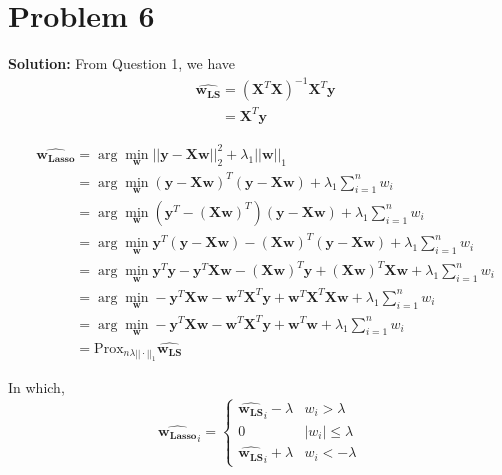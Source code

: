 \documentclass[11pt]{article}
\begin{document}
\section*{Problem 6}
\textbf{Solution:} From Question 1, we have
\begin{align}
	&\hat{\mathbf{w_{LS}}} = (\mathbf{X}^T\mathbf{X})^{-1}\mathbf{X}^T\mathbf{y}\nonumber\\
	&\phantom{\hat{\mathbf{w_{LS}}}} = \mathbf{X}^T\mathbf{y}\nonumber
\end{align}

\begin{align}
	&\hat{\mathbf{w_{\text{Lasso}}}} = \arg\min_{\mathbf{w}} ||\mathbf{y} - \mathbf{Xw}||^2_2 + \lambda_1||\mathbf{w}||_1\nonumber\\
	&\phantom{\hat{\mathbf{w_{\text{Lasso}}}}} = \arg\min_{\mathbf{w}} (\mathbf{y} - \mathbf{Xw})^T(\mathbf{y} - \mathbf{Xw}) + \lambda_1 \sum_{i = 1}^n w_i\nonumber\\
	&\phantom{\hat{\mathbf{w_{\text{Lasso}}}}} = \arg\min_{\mathbf{w}} (\mathbf{y}^T - (\mathbf{Xw})^T)(\mathbf{y} - \mathbf{Xw}) + \lambda_1 \sum_{i = 1}^n w_i\nonumber\\
	&\phantom{\hat{\mathbf{w_{\text{Lasso}}}}} = \arg\min_{\mathbf{w}} \mathbf{y}^T(\mathbf{y} - \mathbf{Xw}) - (\mathbf{Xw})^T(\mathbf{y} - \mathbf{Xw}) + \lambda_1 \sum_{i = 1}^n w_i\nonumber\\
	&\phantom{\hat{\mathbf{w_{\text{Lasso}}}}} = \arg\min_{\mathbf{w}} \mathbf{y}^T\mathbf{y} - \mathbf{y}^T\mathbf{Xw} - (\mathbf{Xw})^T\mathbf{y} + (\mathbf{Xw})^T\mathbf{Xw} + \lambda_1 \sum_{i = 1}^n w_i\nonumber\\
	&\phantom{\hat{\mathbf{w_{\text{Lasso}}}}} = \arg\min_{\mathbf{w}} - \mathbf{y}^T\mathbf{Xw} - \mathbf{w}^T\mathbf{X}^T\mathbf{y} + \mathbf{w}^T\mathbf{X}^T\mathbf{Xw} + \lambda_1 \sum_{i = 1}^n w_i\nonumber\\
	&\phantom{\hat{\mathbf{w_{\text{Lasso}}}}} = \arg\min_{\mathbf{w}} - \mathbf{y}^T\mathbf{Xw} - \mathbf{w}^T\mathbf{X}^T\mathbf{y} + \mathbf{w}^T\mathbf{w} + \lambda_1 \sum_{i = 1}^n w_i\nonumber\\
	&\phantom{\hat{\mathbf{w_{\text{Lasso}}}}} = \text{Prox}_{n\lambda||\cdot||_1} \hat{\mathbf{w_{LS}}}\nonumber
\end{align}

In which,
\[
	\hat{\mathbf{w_{\text{Lasso}}}}_i = 
		\begin{cases}
			\hat{\mathbf{w_{LS}}}_i - \lambda & w_i > \lambda \\
			0 & |w_i| \leq \lambda \\
			\hat{\mathbf{w_{LS}}}_i + \lambda & w_i < -\lambda
		\end{cases}
\]
\end{document}
